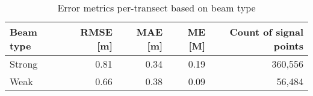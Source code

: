 \begin{table}[htbp]
\centering
\caption{Error metrics per-transect based on beam type}
\label{tab:error-by-strongweak}
\begin{tabular}{lrrrr}
\toprule
Beam type & RMSE [m] & MAE [m] & ME [M] & Count of signal points \\
\midrule
Strong & 0.81 & 0.34 & 0.19 & 360,556 \\
Weak & 0.66 & 0.38 & 0.09 & 56,484 \\
\bottomrule
\end{tabular}
\end{table}

